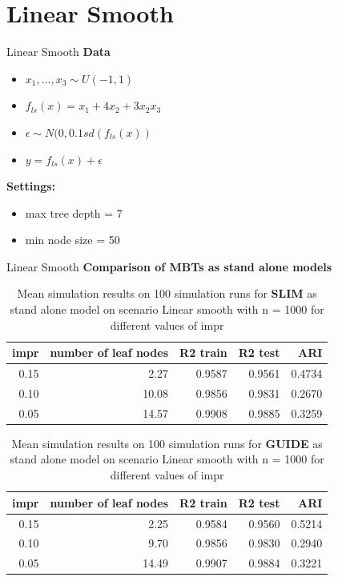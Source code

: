 \documentclass[9pt, xcolor=table]{beamer}
\begin{document}
\section{Linear Smooth}
\begin{frame}{Linear Smooth}
\textbf{Data}
\begin{itemize}
    \item $x_1,..., x_3 \sim U(-1,1)$ 
    \item $ f_{ls}(x) = x_1 + 4   x_2 + 3   x_2   x_3 $
    \item $\epsilon \sim N(0, 0.1 sd(f_{ls}(x))$
    \item $y = f_{ls}(x) + \epsilon$
\end{itemize}

\textbf{Settings:}
\begin{itemize}
    \item max tree depth = 7 
    \item min node size = 50    
\end{itemize}

\end{frame}

\begin{frame}{Linear Smooth}
\textbf{Comparison of MBTs as stand alone models}
\begin{table}
\caption{Mean simulation results on 100 simulation runs for \textbf{SLIM} as stand alone model on scenario Linear smooth with n = 1000 for different values of impr}
\centering 
\begin{tabular}[t]{r|r|r|r|r}
\hline
impr & number of leaf nodes & R2 train & R2 test & ARI\\
\hline
0.15 & 2.27 & 0.9587 & 0.9561 & 0.4734\\
\hline
0.10 & 10.08 & 0.9856 & 0.9831 & 0.2670\\
\hline
0.05 & 14.57 & 0.9908 & 0.9885 & 0.3259\\
\hline
\end{tabular}
\end{table}


\begin{table}

\caption{Mean simulation results on 100 simulation runs for \textbf{GUIDE} as stand alone model on scenario Linear smooth with n = 1000 for different values of impr}
\centering 
\begin{tabular}[t]{r|r|r|r|r}
\hline
impr & number of leaf nodes & R2 train & R2 test & ARI\\
\hline
0.15 & 2.25 & 0.9584 & 0.9560 & 0.5214\\
\hline
0.10 & 9.70 & 0.9856 & 0.9830 & 0.2940\\
\hline
0.05 & 14.49 & 0.9907 & 0.9884 & 0.3221\\
\hline
\end{tabular}
\end{table}
    
\end{frame}
\end{document}
